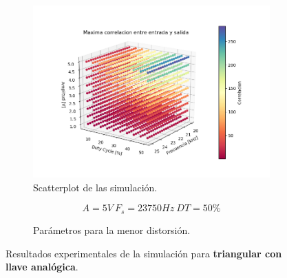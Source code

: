 \begin{figure}[H]
\centering
\begin{subfigure}{\linewidth}
\includegraphics[width=\linewidth]{ImagenesEjercicio6/scatter_llave_triang.png}
\caption{Scatterplot de las simulación.}
\end{subfigure}

\begin{subfigure}{\linewidth}
\[A = 5V \ F_s = 23750Hz \ DT = 50\%\]
\caption{Parámetros para la menor distorsión.}
\end{subfigure}
\label{triang_llave}
\caption{Resultados experimentales de la simulación para \textbf{triangular con llave analógica}.}
\end{figure}

